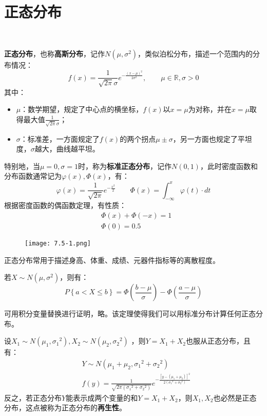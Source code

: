 \section{正态分布}

~

{\bf 正态分布}，也称{\bf 高斯分布}，记作$N\left( \mu ,\sigma ^2 \right) $，类似泊松分布，描述一个范围内的分布情况：
\[
f\left( x \right) =\frac{1}{\sqrt{2\pi}\sigma}e^{-\frac{\left( x-\mu \right) ^2}{2\sigma ^2}},\qquad \mu \in \mathbb{R} ,\sigma >0
\]
其中：
\begin{itemize}
    \item $\mu $：数学期望，规定了中心点的横坐标，$f\left( x \right) $以$x=\mu $为对称，并在$x=\mu $取得最大值$\frac{1}{\sqrt{2\pi}\sigma}$；
    \item $\sigma $：标准差，一方面规定了$f\left( x \right) $的两个拐点$\mu \pm \sigma $，另一方面也规定了平坦度，$\sigma $越大，曲线越平坦。
\end{itemize}
特别地，当$\mu =0,\sigma =1$时，称为{\bf 标准正态分布}，记作$N\left( 0,1 \right) $，此时密度函数和分布函数通常记为$\varphi \left( x \right) ,\varPhi \left( x \right) $，有：
\[
\varphi \left( x \right) =\frac{1}{\sqrt{2\pi}}e^{-\frac{x^2}{2}}\qquad \varPhi \left( x \right) =\int_{-\infty}^x{\varphi \left( t \right) \cdot dt}
\]
根据密度函数的偶函数定理，有性质：
\begin{align*}
&\varPhi \left( x \right) +\varPhi \left( -x \right) =1 \\
&\varPhi \left( 0 \right) =0.5
\end{align*}

\begin{figure}[h]
\centering
\texttt{[image: 7.5-1.png]}
\end{figure}

\begin{tcolorbox}
正态分布常用于描述身高、体重、成绩、元器件指标等的离散程度。
\end{tcolorbox}

\begin{theorem}
若$X\sim N\left( \mu ,\sigma ^2 \right) $，则有：
\[
P\left\{ a<X\leqslant b \right\} =\varPhi \left( \frac{b-\mu}{\sigma} \right) -\varPhi \left( \frac{a-\mu}{\sigma} \right)
\]
\end{theorem}

可用积分变量替换进行证明，略。该定理使得我们可以用标准分布计算任何正态分布。

\begin{theorem}
设$X_1\sim N\left( \mu _1,{\sigma _1}^2 \right) ,X_2\sim N\left( \mu _2,{\sigma _2}^2 \right) $ ，则$Y=X_1+X_2$也服从正态分布，且有：
\begin{align*}
&Y\sim N\left( \mu _1+\mu _2,{\sigma _1}^2+{\sigma _2}^2 \right) \\
&f\left( y \right) =\frac{1}{\sqrt{2\pi \left( {\sigma _1}^2+{\sigma _2}^2 \right)}}e^{-\frac{\left[ y-\left( \mu _1+\mu _2 \right) \right] ^2}{2\left( {\sigma _1}^2+{\sigma _2}^2 \right)}}
\end{align*}
反之，若正态分布$Y$能表示成两个变量的和$Y=X_1+X_2$，则$X_1,X_2$也必然是正态分布，这点被称为正态分布的{\bf 再生性}。
\end{theorem}


